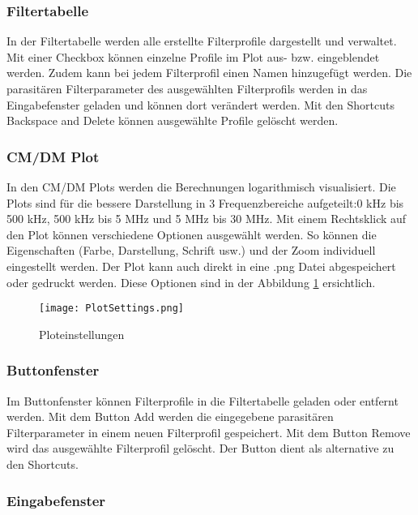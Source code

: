 \subsubsection{Filtertabelle} \label{subsubsec:filtertabelle}

In der Filtertabelle werden alle erstellte Filterprofile dargestellt und verwaltet. Mit einer Checkbox können einzelne Profile im Plot aus- bzw. eingeblendet werden. Zudem kann bei jedem Filterprofil einen Namen hinzugefügt werden. Die parasitären Filterparameter des ausgewählten Filterprofils werden in das Eingabefenster geladen und können dort verändert werden. Mit den Shortcuts Backspace and Delete können ausgewählte Profile gelöscht werden.

\subsubsection{CM/DM Plot} \label{subsubsec:CM_DMplot}

In den CM/DM Plots werden die Berechnungen logarithmisch visualisiert. Die Plots sind für die bessere Darstellung in 3 Frequenzbereiche aufgeteilt:0 kHz bis 500 kHz, 500 kHz bis 5 MHz und 5 MHz bis 30 MHz. Mit einem Rechtsklick auf den Plot können verschiedene Optionen ausgewählt werden. So können die Eigenschaften (Farbe, Darstellung, Schrift usw.) und der Zoom individuell eingestellt werden. Der Plot kann auch direkt in eine .png Datei abgespeichert oder gedruckt werden. Diese Optionen sind in der Abbildung \ref{fig:PlotSettings}  ersichtlich.

\begin{figure}[H]
	\centering
	\texttt{[image: PlotSettings.png]}
	\caption{Ploteinstellungen}
	\label{fig:PlotSettings}
\end{figure} 

\subsubsection{Buttonfenster} \label{subsubsec:buttonfenster}

Im Buttonfenster können Filterprofile in die Filtertabelle geladen oder entfernt werden. Mit dem Button Add werden die eingegebene parasitären Filterparameter in einem neuen Filterprofil gespeichert. Mit dem Button Remove wird das ausgewählte Filterprofil gelöscht. Der Button dient als alternative zu den Shortcuts.

\subsubsection{Eingabefenster} \label{subsubsec:eingabefenster}

